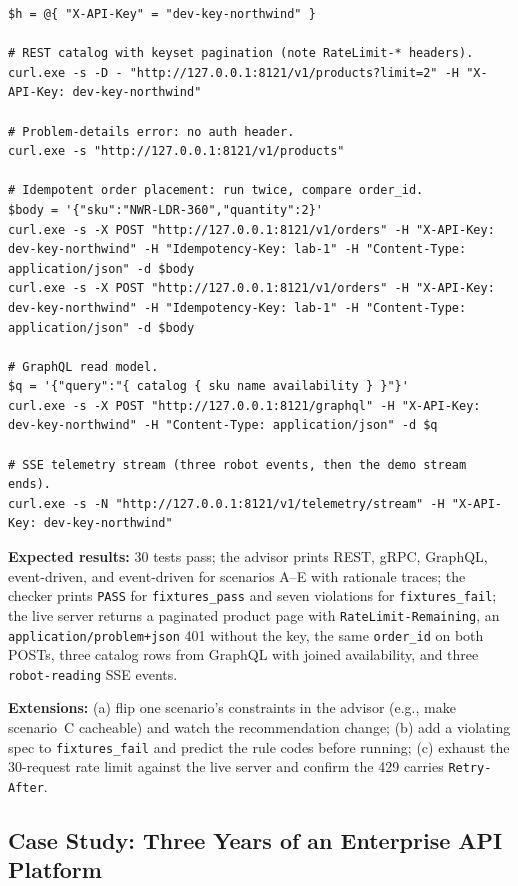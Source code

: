 \begin{verbatim}
$h = @{ "X-API-Key" = "dev-key-northwind" }

# REST catalog with keyset pagination (note RateLimit-* headers).
curl.exe -s -D - "http://127.0.0.1:8121/v1/products?limit=2" -H "X-API-Key: dev-key-northwind"

# Problem-details error: no auth header.
curl.exe -s "http://127.0.0.1:8121/v1/products"

# Idempotent order placement: run twice, compare order_id.
$body = '{"sku":"NWR-LDR-360","quantity":2}'
curl.exe -s -X POST "http://127.0.0.1:8121/v1/orders" -H "X-API-Key: dev-key-northwind" -H "Idempotency-Key: lab-1" -H "Content-Type: application/json" -d $body
curl.exe -s -X POST "http://127.0.0.1:8121/v1/orders" -H "X-API-Key: dev-key-northwind" -H "Idempotency-Key: lab-1" -H "Content-Type: application/json" -d $body

# GraphQL read model.
$q = '{"query":"{ catalog { sku name availability } }"}'
curl.exe -s -X POST "http://127.0.0.1:8121/graphql" -H "X-API-Key: dev-key-northwind" -H "Content-Type: application/json" -d $q

# SSE telemetry stream (three robot events, then the demo stream ends).
curl.exe -s -N "http://127.0.0.1:8121/v1/telemetry/stream" -H "X-API-Key: dev-key-northwind"
\end{verbatim}

\textbf{Expected results:} 30 tests pass; the advisor prints REST, gRPC,
GraphQL, event-driven, and event-driven for scenarios A--E with rationale
traces; the checker prints \texttt{PASS} for \texttt{fixtures\_pass} and
seven violations for \texttt{fixtures\_fail}; the live server returns a
paginated product page with \texttt{RateLimit-Remaining}, an
\texttt{application/problem+json} 401 without the key, the same
\texttt{order\_id} on both POSTs, three catalog rows from GraphQL with
joined availability, and three \texttt{robot-reading} SSE events.

\textbf{Extensions:} (a) flip one scenario's constraints in the advisor
(e.g., make scenario~C cacheable) and watch the recommendation change;
(b) add a violating spec to \texttt{fixtures\_fail} and predict the rule
codes before running; (c) exhaust the 30-request rate limit against the live
server and confirm the 429 carries \texttt{Retry-After}.

\subsection{Case Study: Three Years of an Enterprise API Platform}

